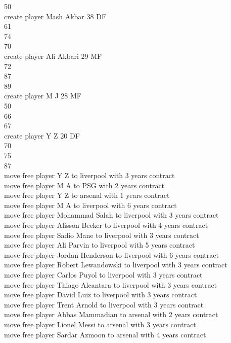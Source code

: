 \documentclass[]{article}
\begin{document}
{50\\
create player Mash Akbar 38 DF\\
61\\
74\\
70\\
create player Ali Akbari 29 MF\\
72\\
87\\
89\\
create player M J 28 MF\\
50\\
66\\
67\\
create player Y Z 20 DF\\
70\\
75\\
87\\
move free player Y Z to liverpool with 3 years contract\\
move free player M A to PSG with 2 years contract\\
move free player Y Z to arsenal with 1 years contract\\
move free player M A to liverpool with 6 years contract\\
move free player Mohammad Salah to liverpool with 3 years contract\\
move free player Alisson Becker to liverpool with 4 years contract\\
move free player Sadio Mane to liverpool with 3 years contract\\
move free player Ali Parvin to liverpool with 5 years contract\\
move free player Jordan Henderson to liverpool with 6 years contract\\
move free player Robert Lewandowski to liverpool with 3 years contract\\
move free player Carlos Puyol to liverpool with 3 years contract\\
move free player Thiago Alcantara to liverpool with 3 years contract\\
move free player David Luiz to liverpool with 3 years contract\\
move free player Trent Arnold to liverpool with 3 years contract\\
move free player Abbas Mammadian to arsenal with 2 years contract\\
move free player Lionel Messi to arsenal with 3 years contract\\
move free player Sardar Azmoon to arsenal with 4 years contract\\
}
\end{document}

